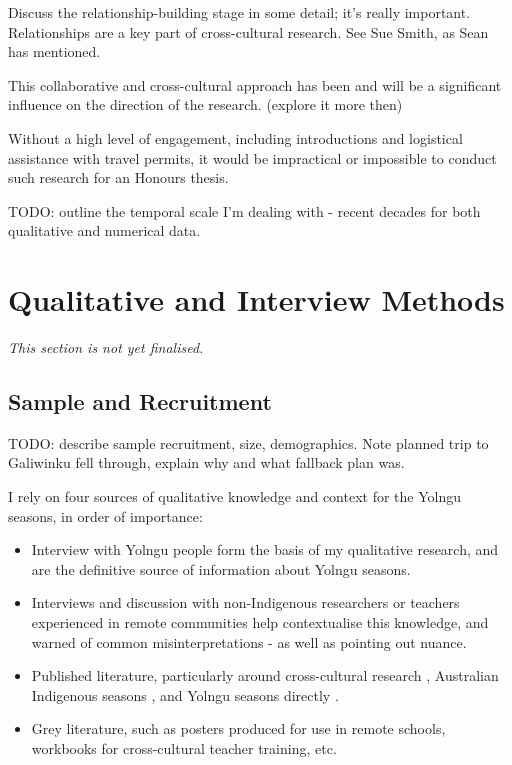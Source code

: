 Discuss the relationship-building stage in some detail; it's really important.
Relationships are a key part of cross-cultural research.  See Sue Smith, as
Sean has mentioned.

This collaborative and cross-cultural approach has been and will be a
significant influence on the direction of the research. (explore it more then)

Without a high level of engagement, including introductions and logistical
assistance with travel permits, it would be impractical or impossible to conduct
such research for an Honours thesis.


TODO:  outline the temporal scale I'm dealing with - recent
decades for both qualitative and numerical data.






\section{Qualitative and Interview Methods}
\textit{This section is not yet finalised.}\\


\subsection{Sample and Recruitment}
TODO: describe sample recruitment, size, demographics.
Note planned trip to Galiwinku fell through, explain why
and what fallback plan was.


I rely on four sources of qualitative knowledge and context for the Yolngu
seasons, in order of importance:

\begin{itemize}
\item Interview with Yolngu people form the basis of my qualitative research, and
        are the definitive source of information about Yolngu seasons.
\item Interviews and discussion with non-Indigenous researchers or teachers experienced
        in remote communities help contextualise this knowledge, and warned of
        common misinterpretations - as well as pointing out nuance.
\item Published literature, particularly around cross-cultural research \citep[eg.][]{smith1999},
        Australian Indigenous seasons \citep[eg.][]{prober2011,oconnor2010}, and Yolngu
        seasons directly \citep{davis1989}.
\item Grey literature, such as posters produced for use in remote schools, workbooks
        for cross-cultural teacher training, etc.
\end{itemize}


